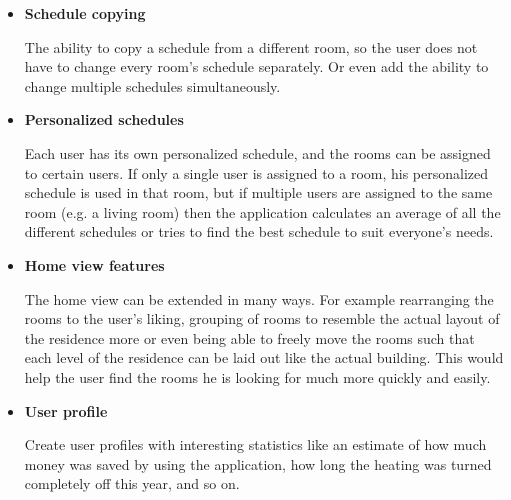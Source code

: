 \begin{itemize} 
	\item{\textbf{Schedule copying}}
	
	The ability to copy a schedule from a different room, so the user does not have to change every room's schedule separately. Or even add the ability to change multiple schedules simultaneously.
	\item{\textbf{Personalized schedules}}
	
	Each user has its own personalized schedule, and the rooms can be assigned to certain users. If only a single user is assigned to a room, his personalized schedule is used in that room, but if multiple users are assigned to the same room (e.g. a living room) then the application calculates an average of all the different schedules or tries to find the best schedule to suit everyone's needs.
	\item{\textbf{Home view features}}
	
	The home view can be extended in many ways. For example rearranging the rooms to the user's liking, grouping of rooms to resemble the actual layout of the residence more or even being able to freely move the rooms such that each level of the residence can be laid out like the actual building. This would help the user find the rooms he is looking for much more quickly and easily.
	\item{\textbf{User profile}}
	
	Create user profiles with interesting statistics like an estimate of how much money was saved by using the application, how long the heating was turned completely off this year, and so on.
\end{itemize}